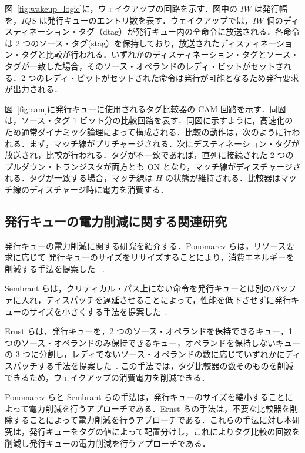 \documentclass[submit,techrep,noauthor]{ipsj}
\newcommand{\fig}[1]{{図~\ref{fig:#1}}}
\begin{document}
\fig{wakeup_logic}に，ウェイクアップの回路を示す．図中の $IW$ は発行幅を，$IQS$ は発行キューのエントリ数を表す．ウェイクアップでは，$IW$ 個のディスティネーション・タグ（dtag）が発行キュー内の全命令に放送される．各命令は 2 つのソース・タグ(stag）を保持しており，放送されたディスティネーション・タグと比較が行われる．いずれかのディスティネーション・タグとソース・タグが一致した場合，そのソース・オペランドのレディ・ビットがセットされる．2 つのレディ・ビットがセットされた命令は発行が可能となるため発行要求が出力される．

\fig{cam}に発行キューに使用されるタグ比較器の CAM 回路を示す．同図は，ソース・タグ 1 ビット分の比較回路を表す．同図に示すように，高速化のため通常ダイナミック論理によって構成される．比較の動作は，次のように行われる．まず，マッチ線がプリチャージされる．次にデスティネーション・タグが放送され，比較が行われる．タグが不一致であれば，直列に接続された 2 つのプルダウン・トランジスタが両方とも ON となり，マッチ線がディスチャージされる．タグが一致する場合，マッチ線は $H$ の状態が維持される．比較器はマッチ線のディスチャージ時に電力を消費する．


\subsection{発行キューの電力削減に関する関連研究}
発行キューの電力削減に関する研究を紹介する．Ponomarev らは，リソース要求に応じて 発行キューのサイズをリサイズすることにより，消費エネルギーを削減する手法を提案した~\cite{ponomarev2001} .

Sembrant らは，クリティカル・パス上にない命令を発行キューとは別のバッファに入れ，ディスパッチを遅延させることによって，性能を低下させずに発行キューのサイズを小さくする手法を提案した~\cite{Sembrant2015}.

Ernst らは，発行キューを，2 つのソース・オペランドを保持できるキュー，1 つのソース・オペランドのみ保持できるキュー，オペランドを保持しないキューの 3 つに分割し，レディでないソース・オペランドの数に応じていずれかにディスパッチする手法を提案した~\cite{ernst2002}. この手法では，タグ比較器の数そのものを削減できるため，ウェイクアップの消費電力を削減できる．

Ponomarev らと Sembrant らの手法は，発行キューのサイズを縮小することによって電力削減を行うアプローチである．Ernst らの手法は，不要な比較器を削除することによって電力削減を行うアプローチである．これらの手法に対し本研究は，発行キューをタグの値によって配置分けし，これによりタグ比較の回数を削減し発行キューの電力削減を行うアプローチである．

\end{document}
